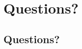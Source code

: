 \documentclass[mathserif,10pt]{beamer}
\begin{document}
\frame
{
  \begin{figure}[h]
  \centering
  \end{figure}
}

\frame
{
  \frametitle{\subsecname}
  \lstdfs
}

\section{Questions?}
\subsection{Questions?}
\frame
{}
\end{document}
